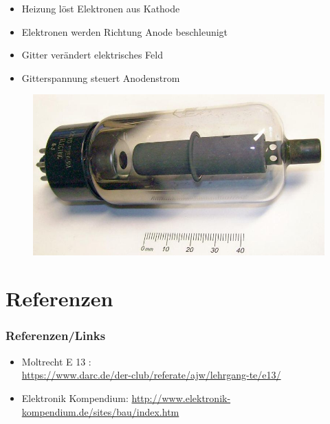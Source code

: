 \begin{frame}
\begin{minipage}{0.3\textwidth}
\begin{figure}
    \end{figure}
  \end{minipage}
  \hspace{0.5cm}
  \begin{minipage}{0.5\textwidth}
    \begin{small}
      \begin{itemize}
        \item Heizung löst Elektronen aus Kathode
        \item Elektronen werden Richtung Anode beschleunigt
        \item Gitter verändert elektrisches Feld
        \item Gitterspannung steuert Anodenstrom
      \end{itemize}
    \end{small}
    \begin{center}
      \begin{figure}
        \includegraphics[width=\textwidth,height=.3\textheight,keepaspectratio]{e13/Triode.jpg}
      \end{figure}
    \end{center}
  \end{minipage}
\end{frame}

\appendix
\section*{Referenzen}
\begin{frame}
  \frametitle{Referenzen/Links}

  \footnotesize
  \begin{itemize}
    \item Moltrecht E 13 : \\
      \url{https://www.darc.de/der-club/referate/ajw/lehrgang-te/e13/}
    \item Elektronik Kompendium:
      \url{http://www.elektronik-kompendium.de/sites/bau/index.htm}
  \end{itemize}

\end{frame}



